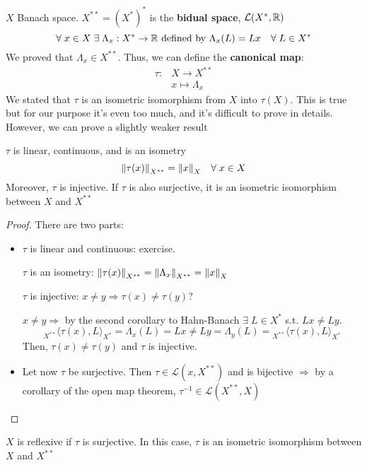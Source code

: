 \noindent\(X\) Banach space. \(X^{**} = (X^*)^*\) is the \textbf{bidual space}, \(\mathcal{L}(X^*, \mathbb{R})\)
\[
    \forall \; x \in X \; \exists \; \Lambda_x : X^* \to \mathbb{R} \mbox{ defined by } \Lambda_x(L) = Lx \quad \forall \; L \in X^*
\]
We proved that \(\Lambda_x \in X^{**}\). Thus, we can define the \textbf{canonical map}:
\[
        \begin{array}{lc}
            \tau : & X \to X^{**} \\
            & x \mapsto \Lambda_x
        \end{array}
    \tag*{(Canonical Map)}
\]
We stated that \(\tau\) is an isometric isomorphism from \(X\) into \(\tau(X)\). This is true but for our purpose it's even too much, and it's difficult to prove in details. However, we can prove a slightly weaker result 
\begin{theorem}
    \(\tau\) is linear, continuous, and is an isometry
    \[
        \norm{\tau(x)}_{X^{**}} = \norm{x}_X \quad \forall \; x \in X
    \]
    Moreover, \(\tau\) is injective. If \(\tau\) is also surjective, it is an isometric isomorphism between \(X\) and \(X^{**}\)
\end{theorem}
\begin{proof}
    There are two parts:
    \begin{itemize}
        \item \(\tau\) is linear and continuous: exercise. 
        
        \noindent \(\tau\) is an isometry: \(\norm{\tau(x)}_{X^{**}} = \norm{\Lambda_x}_{X^{**}} = \norm{x}_X\)

        \noindent \(\tau\) is injective: \(x\neq y \Rightarrow \tau(x) \neq \tau(y)\)? 

        \noindent \(x \neq y \Rightarrow\) by the second corollary to Hahn-Banach \(\exists\; L \in X^*\) s.t. \(Lx \neq Ly\).
        \[
            {}_{X^{**}}\langle \tau(x), L \rangle_{X^*} = \Lambda_x(L) = Lx \neq Ly = \Lambda_y(L) = {}_{X^{**}}\langle\tau(x), L\rangle_{X^*}
        \]
        Then, \(\tau(x) \neq \tau(y)\) and \(\tau\) is injective.
        \item Let now \(\tau\) be surjective. Then \(\tau \in \mathcal{L}(x, X^{**})\) and is bijective \(\Rightarrow\) by a corollary of the open map theorem, \(\tau^{-1} \in \mathcal{L}(X^{**}, X)\)
    \end{itemize}
\end{proof}
\begin{definition}
    \(X\) is reflexive if \(\tau\) is surjective. In this case, \(\tau\) is an isometric isomorphism between \(X\) and \(X^{**}\)
\end{definition}

